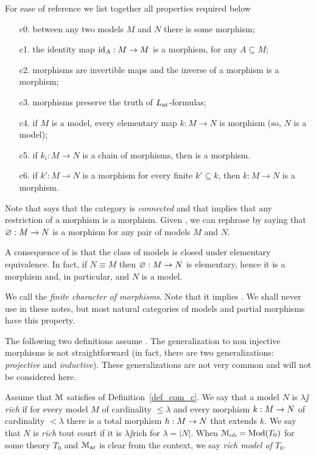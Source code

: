 \documentclass[creche.tex]{subfiles}
\begin{document}
\begin{definition}\label{def_com_c}For ease of reference we list together all properties required below
\begin{itemize} 
\item[c0.] between any two models $M$ and $N$ there is some morphism;
\item[c1.] the identity map $\textrm{id}_A:M\to M$ is a morphism, for any $A\subseteq M$;
\item[c2.] morphisms are invertible maps and the inverse of a morphism is a morphism;
\item[c3.] morphisms preserve the truth of $L_{\tiny\rm at}\hskip-.3ex$\,-formulas;
\item[c4.] if $M$ is a model, every elementary map $k:M\to N$ is morphism (so, $N$ is a model);
\item[c5.] if $k_i:M\to N$ is a chain of morphisms, then  is a morphism.
\item[c6.] if $k':M\to N$ is a morphism for every finite $k'\subseteq k$, then $k:M\to N$ is a morphism.\QED
\end{itemize}
\end{definition}
 
Note that  says that the category is \emph{connected} and that  implies that any restriction of a morphism is a morphism. Given , we can rephrase  by saying that $\varnothing:M\to N$ is a morphism for any pair of models $M$ and $N$. 

A consequence of  is that the class of models is closed under elementary equivalence. In fact, if $N\equiv M$ then $\varnothing:M\to N$ is elementary, hence it is a morphism and, in particular, and $N$ is a model. 

We call  the \emph{finite character of morphisms}. Note that it implies . We shall never use  in these notes, but most natural categories of models and partial morphisms have this property.

The following two definitions assume . The generalization to non injective morphisms is not straightforward (in fact, there are two generalizations: \textit{projective\/} and \textit{inductive\/}). These generalizations are not very common and will not be considered here. 

\begin{definition}
Assume that $\EuScript M$ satisfies  of Definition~\ref{def_com_c}. We say that a model $N$ is \emph{$\lambda\jj$rich\/} if for every model $M$ of cardinality $\le\lambda$ and every morphism $k:M\rightarrow N$ of cardinality $<\lambda$ there is a total morphism $h:M\rightarrow N$ that extends $k$. We say that $N$ is \emph{rich\/} tout court  if it is $\lambda\jj$rich for $\lambda=|N|$. When $\EuScript M_{\rm ob}=\mathop{\rm Mod}(T_0)$ for some theory $T_0$ and $\EuScript M_{\rm ar}$ is clear from the context, we say \emph{rich model of $T_0$}.\QED
\end{definition}
\end{document}
